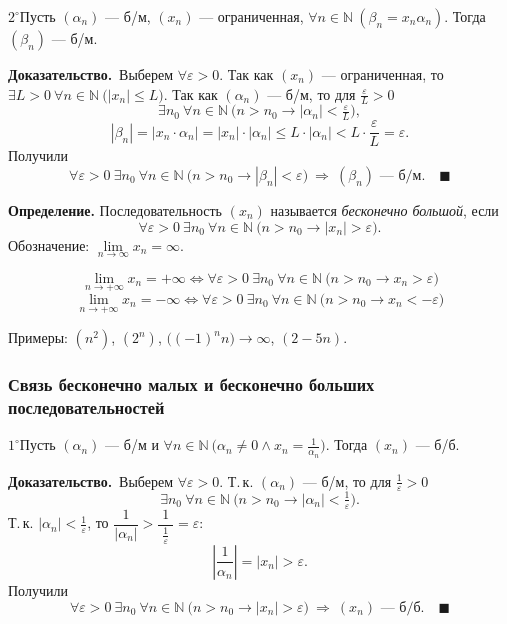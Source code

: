 \documentclass[a4paper,11pt]{article}
\newcommand{\dok}{\textbf{Доказательство.}\ }
\begin{document}
\begin{svoi}{$2^\circ$}Пусть $(\alpha_n)$ --- б/м, $(x_n)$ --- ограниченная,
$\forall n \in \mathbb{N}\ (\beta_n = x_n \alpha_n)$. Тогда $(\beta_n)$ --- б/м.
\end{svoi}

\dok Выберем $\forall \varepsilon > 0$.
Так как $(x_n)$ --- ограниченная, то
$\exists L > 0\ \forall n \in \mathbb{N}\ \big(|x_n| \le L\big)$.
Так как $(\alpha_n)$ --- б/м, то для $\frac{\varepsilon}{L} > 0$
\[
  \exists n_0\ \forall n \in \mathbb{N}\ \big(n > n_0 \to |\alpha_n| < \tfrac{\varepsilon}{L}\big),
\]
\[
  |\beta_n| = |x_n \cdot \alpha_n| = |x_n| \cdot |\alpha_n| \le L \cdot |\alpha_n|
  < L \cdot \frac{\varepsilon}{L} = \varepsilon.
\]
Получили
\[
  \forall \varepsilon > 0\ \exists n_0\ \forall n \in \mathbb{N}\
  \big(n > n_0 \to |\beta_n| < \varepsilon\big)
  \ \Longrightarrow\ (\beta_n) \text{ --- б/м}.\quad\blacksquare
\]

\begin{opr}
\textbf{Определение.}
  Последовательность $(x_n)$ называется \emph{бесконечно большой}, если
  \[
    \forall \varepsilon > 0\ \exists n_0\ \forall n \in \mathbb{N}\
    \big(n > n_0 \to |x_n| > \varepsilon\big).
  \]
  Обозначение: $\lim\limits_{n \to \infty} x_n = \infty$.
\end{opr}

\[
  \lim_{n \to +\infty} x_n = +\infty \Leftrightarrow
  \forall \varepsilon > 0\ \exists n_0\ \forall n \in \mathbb{N}\
  \big(n > n_0 \to x_n > \varepsilon\big)
\]
\[
  \lim_{n \to +\infty} x_n = -\infty \Leftrightarrow
  \forall \varepsilon > 0\ \exists n_0\ \forall n \in \mathbb{N}\
  \big(n > n_0 \to x_n < -\varepsilon\big)
\]

Примеры: $(n^2)$, $(2^n)$, $\big((-1)^n n\big) \to \infty$, $(2 - 5n)$.

\subsubsection{Связь бесконечно малых и бесконечно больших последовательностей}

\begin{svoi}{$1^\circ$}Пусть $(\alpha_n)$ --- б/м и
$\forall n \in \mathbb{N}\ \big(\alpha_n \ne 0 \wedge x_n = \frac{1}{\alpha_n}\big)$.
Тогда $(x_n)$ --- б/б.
\end{svoi}

\dok Выберем $\forall \varepsilon > 0$. Т.\,к. $(\alpha_n)$ --- б/м, то для
$\frac{1}{\varepsilon} > 0$
\[
  \exists n_0\ \forall n \in \mathbb{N}\ \big(n > n_0 \to |\alpha_n| < \tfrac{1}{\varepsilon}\big).
\]
Т.\,к. $|\alpha_n| < \frac{1}{\varepsilon}$, то
$\dfrac{1}{|\alpha_n|} > \dfrac{1}{\;\frac{1}{\varepsilon}\;} = \varepsilon$:
\[
  \left|\frac{1}{\alpha_n}\right| = |x_n| > \varepsilon.
\]
Получили
\[
  \forall \varepsilon > 0\ \exists n_0\ \forall n \in \mathbb{N}\
  \big(n > n_0 \to |x_n| > \varepsilon\big)
  \ \Longrightarrow\ (x_n) \text{ --- б/б}.\quad\blacksquare
\]
\end{document}
